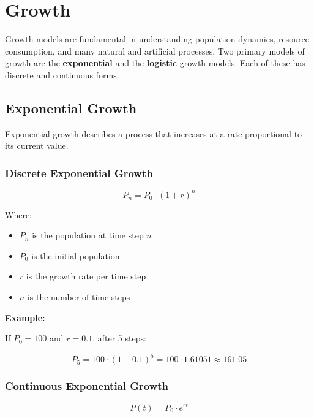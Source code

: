 \newpage
\section{Growth}

Growth models are fundamental in understanding population dynamics, resource consumption, and many natural and artificial processes. Two primary models of growth are the \textbf{exponential} and the \textbf{logistic} growth models. Each of these has discrete and continuous forms.

\subsection{Exponential Growth}

Exponential growth describes a process that increases at a rate proportional to its current value.

\subsubsection{Discrete Exponential Growth}

\[
  P_{n} = P_0 \cdot (1 + r)^n
\]

Where:

\begin{itemize}

  \item \(P_n\) is the population at time step \(n\)

  \item \(P_0\) is the initial population

  \item \(r\) is the growth rate per time step

  \item \(n\) is the number of time steps

\end{itemize}

\textbf{Example:}
\vspace{\baselineskip}
  
If \(P_0 = 100\) and \(r = 0.1\), after 5 steps:

\[
  P_5 = 100 \cdot {(1 + 0.1)}^5 = 100 \cdot 1.61051 \approx 161.05
\]

\subsubsection{Continuous Exponential Growth}

  \[
P(t) = P_0 \cdot e^{rt}
\]

